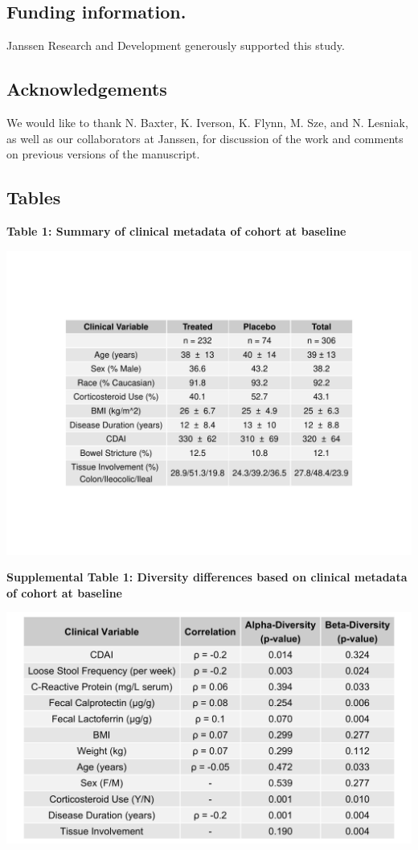 \documentclass[12pt,]{article}
\begin{document}
\subsection{Funding information.}\label{funding-information.}

Janssen Research and Development generously supported this study.

\subsection{Acknowledgements}\label{acknowledgements}

We would like to thank N. Baxter, K. Iverson, K. Flynn, M. Sze, and N.
Lesniak, as well as our collaborators at Janssen, for discussion of the
work and comments on previous versions of the manuscript.

\newpage

\subsection{Tables}\label{tables}

\textbf{Table 1: Summary of clinical metadata of cohort at baseline}

\includegraphics{tables/Table1_baseline_metadata.pdf}

\newpage

\textbf{Supplemental Table 1: Diversity differences based on clinical
metadata of cohort at baseline}

\includegraphics{tables/Supp.table1_cohortdiversity.pdf}
\end{document}
